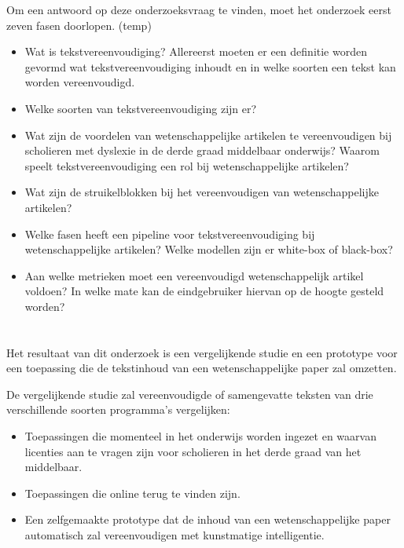 Om een antwoord op deze onderzoeksvraag te vinden, moet het onderzoek eerst zeven fasen doorlopen. (temp)
\begin{itemize}
	\item Wat is tekstvereenvoudiging? Allereerst moeten er een definitie worden gevormd wat tekstvereenvoudiging inhoudt en in welke soorten een tekst kan worden vereenvoudigd. 
	\item Welke soorten van tekstvereenvoudiging zijn er?
	\item Wat zijn de voordelen van wetenschappelijke artikelen te vereenvoudigen bij scholieren met dyslexie in de derde graad middelbaar onderwijs? Waarom speelt tekstvereenvoudiging een rol bij wetenschappelijke artikelen?
	\item Wat zijn de struikelblokken bij het vereenvoudigen van wetenschappelijke artikelen?
	\item Welke fasen heeft een pipeline voor tekstvereenvoudiging bij wetenschappelijke artikelen? Welke modellen zijn er white-box of black-box?
	\item Aan welke metrieken moet een vereenvoudigd wetenschappelijk artikel voldoen? In welke mate kan de eindgebruiker hiervan op de hoogte gesteld worden? 
\end{itemize}


\section{}%
\label{sec:onderzoeksdoelstelling}


Het resultaat van dit onderzoek is een vergelijkende studie en een prototype voor een toepassing die de tekstinhoud van een wetenschappelijke paper zal omzetten.

De vergelijkende studie zal vereenvoudigde of samengevatte teksten van drie verschillende soorten programma's vergelijken:
\begin{itemize}
	\item Toepassingen die momenteel in het onderwijs worden ingezet en waarvan licenties aan te vragen zijn voor scholieren in het derde graad van het middelbaar.
	\item Toepassingen die online terug te vinden zijn.
	\item Een zelfgemaakte prototype dat de inhoud van een wetenschappelijke paper automatisch zal vereenvoudigen met kunstmatige intelligentie.
\end{itemize}

